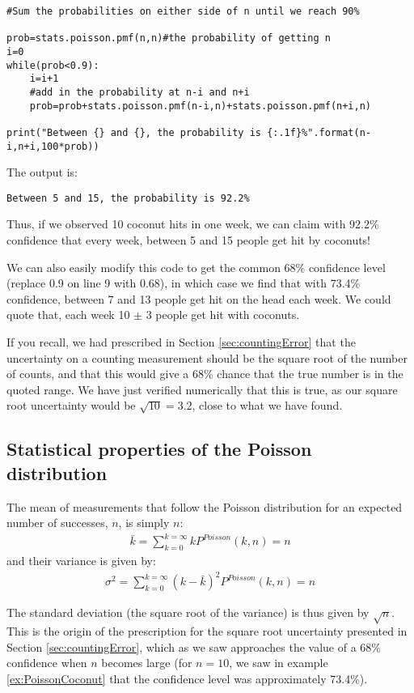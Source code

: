 \begin{example}{}
\begin{lstlisting}[frame=single]
#Sum the probabilities on either side of n until we reach 90%

prob=stats.poisson.pmf(n,n)#the probability of getting n
i=0
while(prob<0.9):
    i=i+1
    #add in the probability at n-i and n+i
    prob=prob+stats.poisson.pmf(n-i,n)+stats.poisson.pmf(n+i,n)
    
print("Between {} and {}, the probability is {:.1f}%".format(n-i,n+i,100*prob))
\end{lstlisting}
The output is:
\begin{verbatim}
Between 5 and 15, the probability is 92.2%
\end{verbatim}
Thus, if we observed 10 coconut hits in one week, we can claim with 92.2\% confidence that every week, between 5 and 15 people get hit by coconuts! 

We can also easily modify this code to get the common 68\% confidence level (replace 0.9 on line 9 with 0.68), in which case we find that with 73.4\% confidence, between 7 and 13 people get hit on the head each week. We could quote that, each week 10 $\pm$ 3 people get hit with coconuts.

If you recall, we had prescribed in Section \ref{sec:countingError} that the uncertainty on a counting measurement should be the square root of the number of counts, and that this would give a 68\% chance that the true number is in the quoted range. We have just verified numerically that this is true, as our square root uncertainty would be $\sqrt{10}=3.2$, close to what we have found. 
\end{example}   

\subsection{Statistical properties of the Poisson distribution}
The mean of measurements that follow the Poisson distribution for an expected number of successes, $n$, is simply $n$:
\begin{align}
\bar k = \sum_{k=0}^{k=\infty}kP^{Poisson}(k,n)=n
\end{align}
and their variance is given by:
\begin{align}
\sigma^2 = \sum_{k=0}^{k=\infty}(k-\bar k)^2P^{Poisson}(k,n)=n
\end{align}

The standard deviation (the square root of the variance) is thus given by $\sqrt{n}$. This is the origin of the prescription for the square root uncertainty presented in Section \ref{sec:countingError}, which as we saw approaches the value of a 68\% confidence when $n$ becomes large (for $n=10$, we saw in example \ref{ex:PoissonCoconut} that the confidence level was approximately 73.4\%).

